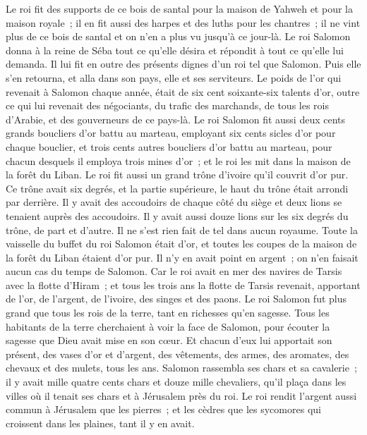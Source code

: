 \begin{multicols}{2}
Le roi fit des supports de ce bois de santal pour la maison de Yahweh et pour la maison royale~; il en fit aussi des harpes et des luths pour les chantres~; il ne vint plus de ce bois de santal et on n'en a plus vu jusqu'à ce jour-là.
Le roi Salomon donna à la reine de Séba tout ce qu'elle désira et répondit à tout ce qu'elle lui demanda. Il lui fit en outre des présents dignes d'un roi tel que Salomon. Puis elle s'en retourna, et alla dans son pays, elle et ses serviteurs.
Le poids de l'or qui revenait à Salomon chaque année, était de six cent soixante-six talents d'or,
outre ce qui lui revenait des négociants, du trafic des marchands, de tous les rois d'Arabie, et des gouverneurs de ce pays-là.
Le roi Salomon fit aussi deux cents grands boucliers d'or battu au marteau, employant six cents sicles d'or pour chaque bouclier,
et trois cents autres boucliers d'or battu au marteau, pour chacun desquels il employa trois mines d'or~; et le roi les mit dans la maison de la forêt du Liban.
Le roi fit aussi un grand trône d'ivoire qu'il couvrit d'or pur.
Ce trône avait six degrés, et la partie supérieure, le haut du trône était arrondi par derrière. Il y avait des accoudoirs de chaque côté du siège et deux lions se tenaient auprès des accoudoirs.
Il y avait aussi douze lions sur les six degrés du trône, de part et d'autre. Il ne s'est rien fait de tel dans aucun royaume.
Toute la vaisselle du buffet du roi Salomon était d'or, et toutes les coupes de la maison de la forêt du Liban étaient d'or pur. Il n'y en avait point en argent~; on n'en faisait aucun cas du temps de Salomon.
Car le roi avait en mer des navires de Tarsis avec la flotte d'Hiram~; et tous les trois ans la flotte de Tarsis revenait, apportant de l'or, de l'argent, de l'ivoire, des singes et des paons.
Le roi Salomon fut plus grand que tous les rois de la terre, tant en richesses qu'en sagesse.
Tous les habitants de la terre cherchaient à voir la face de Salomon, pour écouter la sagesse que Dieu avait mise en son cœur.
Et chacun d'eux lui apportait son présent, des vases d'or et d'argent, des vêtements, des armes, des aromates, des chevaux et des mulets, tous les ans.
Salomon rassembla ses chars et sa cavalerie~; il y avait mille quatre cents chars et douze mille chevaliers, qu'il plaça dans les villes où il tenait ses chars et à Jérusalem près du roi.
Le roi rendit l'argent aussi commun à Jérusalem que les pierres~; et les cèdres que les sycomores qui croissent dans les plaines, tant il y en avait.

\end{multicols}
